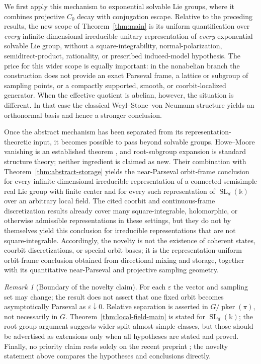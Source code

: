 \documentclass[reqno]{amsart}
\numberwithin{equation}{section}
\theoremstyle{definition}
\theoremstyle{remark}
\newtheorem{remark}[theorem]{Remark}
\newcommand{\pker}{\operatorname{pker}}
\begin{document}
We first apply this mechanism to exponential solvable Lie groups, where it
combines projective $C_0$ decay with conjugation escape.  Relative to the
preceding results, the
new scope of Theorem~\ref{thm:main} is its uniform quantification over
\emph{every} infinite-dimensional irreducible unitary representation of
\emph{every} exponential solvable Lie group, without a square-integrability,
normal-polarization, semidirect-product, rationality, or prescribed
induced-model hypothesis.  The price for this wider scope is equally
important: in the nonabelian branch the construction does not provide an
exact Parseval frame, a lattice or subgroup of sampling points, or a compactly
supported, smooth, or coorbit-localized generator.  When the effective
quotient is abelian, however, the situation is different.  In that case the
classical Weyl--Stone--von Neumann structure yields an orthonormal basis and
hence a stronger conclusion.

Once the abstract mechanism has been separated from its
representation-theoretic input, it becomes possible to pass beyond solvable
groups.
Howe--Moore vanishing is an established theorem
\cite{HoweMoore1979,Ciobotaru2014}, and root-subgroup expansion is standard
structure theory; neither ingredient is claimed as new.  Their combination
with Theorem~\ref{thm:abstract-storage} yields the near-Parseval orbit-frame
conclusion for every infinite-dimensional irreducible representation of a
connected semisimple real Lie group with finite center and for every such
representation of $\operatorname{SL}_d(\mathbb k)$ over an arbitrary local
field.  The cited coorbit and continuous-frame discretization results already
cover many square-integrable, holomorphic, or otherwise admissible
representations in these settings, but they do not by themselves yield this
conclusion for irreducible representations that are not square-integrable.
Accordingly, the novelty is not the existence of coherent states, coorbit
discretizations, or special orbit bases; it is the representation-uniform
orbit-frame conclusion obtained from directional mixing and storage,
together with its quantitative near-Parseval and projective sampling geometry.

\begin{remark}[Boundary of the novelty claim]
For each $\varepsilon$ the vector and sampling set may change; the result does
not assert that one fixed orbit becomes asymptotically Parseval as
$\varepsilon\downarrow0$.  Relative separation is asserted in
$G/\pker(\pi)$, not necessarily in $G$.
Theorem~\ref{thm:local-field-main} is stated for
$\operatorname{SL}_d(\mathbb k)$; the root-group argument suggests wider
split almost-simple classes, but those should be advertised as extensions
only when all hypotheses are stated and proved.  Finally, no priority claim
rests solely on the recent preprint \cite{Oussa2026}; the novelty statement
above compares the hypotheses and conclusions directly.
\end{remark}
\end{document}
